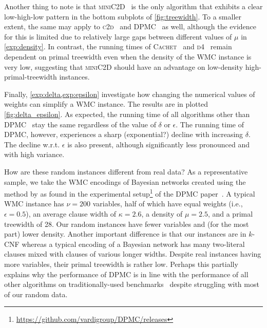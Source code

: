 \documentclass{article}
\theoremstyle{definition}
\begin{document}
Another thing to note is that \textsc{miniC2D}~\cite{DBLP:conf/ijcai/OztokD15} is the only algorithm that exhibits a clear low-high-low pattern in the bottom subplots of \cref{fig:treewidth}. To a smaller extent, the same may apply to \textsc{c2d}~\cite{DBLP:conf/ecai/Darwiche04} and \textsc{DPMC}~\cite{DBLP:conf/cp/DudekPV20} as well, although the evidence for this is limited due to relatively large gaps between different values of $\mu$ in \cref{exp:density}. In contrast, the running times of \textsc{Cachet}~\cite{DBLP:conf/sat/SangBBKP04} and \textsc{d4}~\cite{DBLP:conf/ijcai/LagniezM17} remain dependent on primal treewidth even when the density of the \textsf{WMC} instance is very low, suggesting that \textsc{miniC2D} should have an advantage on low-density high-primal-treewidth instances.

Finally, \cref{exp:delta,exp:epsilon} investigate how changing the numerical values of weights can simplify a \textsf{WMC} instance. The results are in plotted \cref{fig:delta_epsilon}. As expected, the running time of all algorithms other than \textsc{DPMC}~\cite{DBLP:conf/cp/DudekPV20} stay the same regardless of the value of $\delta$ or $\epsilon$. The running time of \textsc{DPMC}, however, experiences a sharp (exponential?) decline with increasing $\delta$. The decline w.r.t. $\epsilon$ is also present, although significantly less pronounced and with high variance.

How are these random instances different from real data? As a representative sample, we take the \textsf{WMC} encodings of Bayesian networks created using the method by \citeauthor{DBLP:conf/aaai/SangBK05}  as found in the experimental setup\footnote{\url{https://github.com/vardigroup/DPMC/releases}} of the \textsc{DPMC} paper~\cite{DBLP:conf/cp/DudekPV20}. A typical \textsf{WMC} instance has $\nu = 200$ variables, half of which have equal weights (i.e., $\epsilon = 0.5$), an average clause width of $\kappa = 2.6$, a density of $\mu = 2.5$, and a primal treewidth of 28. Our random instances have fewer variables and (for the most part) lower density. Another important difference is that our instances are in $k$-CNF whereas a typical encoding of a Bayesian network has many two-literal clauses mixed with clauses of various longer widths. Despite real instances having more variables, their primal treewidth is rather low. Perhaps this partially explains why the performance of \textsc{DPMC} is in line with the performance of all other algorithms on traditionally-used benchmarks~\cite{DBLP:conf/cp/DudekPV20} despite struggling with most of our random data.
\end{document}
